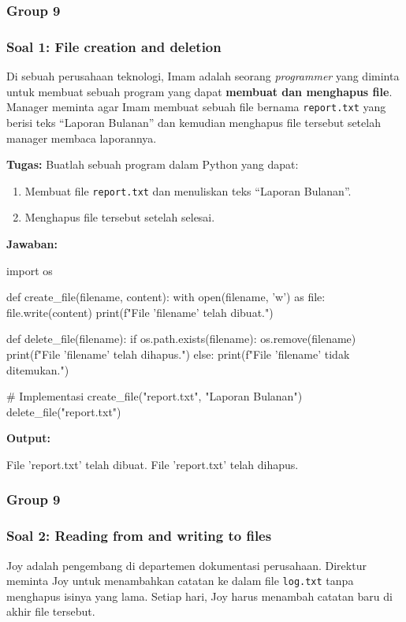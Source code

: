 \documentclass[12pt]{article}
\begin{document}
\subsubsection{Group 9}
\subsubsection*{Soal 1: File creation and deletion}
Di sebuah perusahaan teknologi, Imam adalah seorang \textit{programmer} yang diminta untuk membuat sebuah program yang dapat \textbf{membuat dan menghapus file}. Manager meminta agar Imam membuat sebuah file bernama \texttt{report.txt} yang berisi teks ``Laporan Bulanan'' dan kemudian menghapus file tersebut setelah manager membaca laporannya.

\textbf{Tugas:} Buatlah sebuah program dalam Python yang dapat:
\begin{enumerate}
    \item Membuat file \texttt{report.txt} dan menuliskan teks ``Laporan Bulanan''.
    \item Menghapus file tersebut setelah selesai.
\end{enumerate}

\textbf{Jawaban:}
\begin{python}
import os

def create_file(filename, content):
    with open(filename, 'w') as file:
        file.write(content)
    print(f"File '{filename}' telah dibuat.")

def delete_file(filename):
    if os.path.exists(filename):
        os.remove(filename)
        print(f"File '{filename}' telah dihapus.")
    else:
        print(f"File '{filename}' tidak ditemukan.")

# Implementasi
create_file("report.txt", "Laporan Bulanan")
delete_file("report.txt")
\end{python}

\textbf{Output:}
\begin{python}
File 'report.txt' telah dibuat.
File 'report.txt' telah dihapus.
\end{python}

\subsubsection{Group 9}
\subsubsection*{Soal 2: Reading from and writing to files}
Joy adalah pengembang di departemen dokumentasi perusahaan. Direktur meminta Joy untuk menambahkan catatan ke dalam file \texttt{log.txt} tanpa menghapus isinya yang lama. Setiap hari, Joy harus menambah catatan baru di akhir file tersebut.
\end{document}

